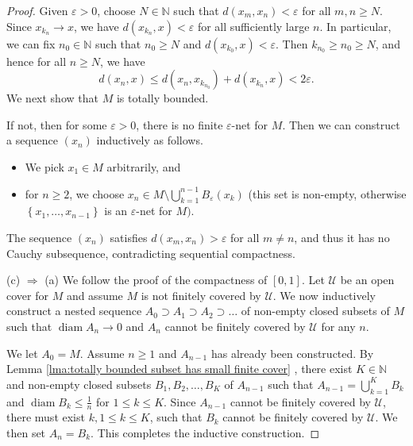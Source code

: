 \documentclass[a4paper]{article}
\begin{document}
\begin{proof}
Given $\varepsilon>0$, choose $N \in \mathbb{N}$ such that $d\left(x_{m}, x_{n}\right)<\varepsilon$ for all $m, n \geqslant N$. Since $x_{k_{n}} \rightarrow x$, we have $d\left(x_{k_{n}}, x\right)<\varepsilon$ for all sufficiently large $n$. In particular, we can fix $n_{0} \in \mathbb{N}$ such that $n_{0} \geqslant N$ and $d\left(x_{k_{0}}, x\right)<\varepsilon$. Then $k_{n_{0}} \geqslant n_{0} \geqslant N$, and hence for all $n \geqslant N$, we have
$$
d\left(x_{n}, x\right) \leqslant d\left(x_{n}, x_{k_{n_{0}}}\right)+d\left(x_{k_{n}}, x\right)<2 \varepsilon.
$$
We next show that $M$ is totally bounded. 

If not, then for some $\varepsilon>0$, there is no finite $\varepsilon$-net for $M$. Then we can construct a sequence $\left(x_{n}\right)$ inductively as follows. 
\begin{itemize}
    \item We pick $x_{1} \in M$ arbitrarily, and 
    \item for $n \geqslant 2$, we choose $x_{n} \in M \setminus \bigcup_{k=1}^{n-1} B_{\varepsilon}\left(x_{k}\right)$ (this set is non-empty, otherwise $\left\{x_{1}, \ldots, x_{n-1}\right\}$ is an $\varepsilon$-net for $M)$.
\end{itemize}
The sequence $\left(x_{n}\right)$ satisfies $d\left(x_{m}, x_{n}\right)>\varepsilon$ for all $m \neq n$, and thus it has no Cauchy subsequence, contradicting sequential compactness.

(c) $\Longrightarrow$ (a) We follow the proof of the compactness of $[0,1]$. 
Let $\mathcal{U}$ be an open cover for $M$ and assume $M$ is not finitely covered by $\mathcal{U}$. We now inductively construct a nested sequence $A_{0} \supset A_{1} \supset A_{2} \supset \ldots$ of non-empty closed subsets of $M$ such that $\operatorname{diam} A_{n} \rightarrow 0$ and $A_{n}$ cannot be finitely covered by $\mathcal{U}$ for any $n$. 

We let $A_{0}=M$. Assume $n \geqslant 1$ and $A_{n-1}$ has already been constructed. By Lemma \ref{lma:totally bounded subset has small finite cover} , there exist $K \in \mathbb{N}$ and non-empty closed subsets $B_{1}, B_{2}, \ldots, B_{K}$ of $A_{n-1}$ such that $A_{n-1}=\bigcup_{k=1}^{K} B_{k}$ and $\operatorname{diam} B_{k} \leqslant \frac{1}{n}$ for $1 \leqslant k \leqslant K$. Since $A_{n-1}$ cannot be finitely covered by $\mathcal{U}$, there must exist $k, 1 \leqslant k \leqslant K$, such that $B_{k}$ cannot be finitely covered by $\mathcal{U}$. We then set $A_{n}=B_{k}$. This completes the inductive construction.


\end{proof}
\end{document}
